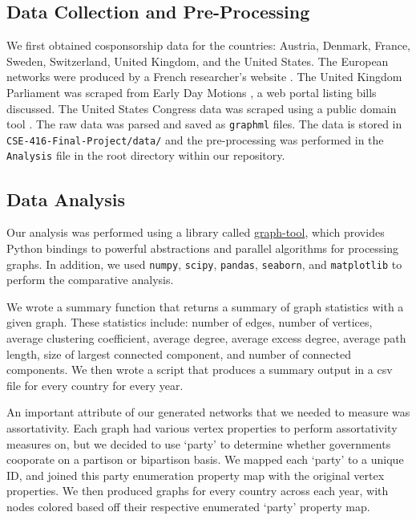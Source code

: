 \documentclass[12pt]{article}
\begin{document}
\begin{multicols*}{2}
\subsection{Data Collection and Pre-Processing}
We first obtained cosponsorship data for the countries: Austria, Denmark, France, Sweden, Switzerland, United Kingdom, and the United States. The European networks were produced by a French researcher's website \cite{briatte}. The United Kingdom Parliament was scraped from Early Day Motions \cite{UK}, a web portal listing bills discussed. The United States Congress data was scraped using a public domain tool \cite{US}. The raw data was parsed and saved as \texttt{graphml} files. 
The data is stored in \texttt{CSE-416-Final-Project/data/} and the pre-processing was performed in the \texttt{Analysis} file in the root directory within our repository.

\subsection{Data Analysis}

Our analysis was performed using a library called \href{https://graph-tool.skewed.de}{graph-tool}, which provides Python bindings to powerful abstractions and parallel algorithms for processing graphs. In addition, we used \texttt{numpy}, \texttt{scipy}, \texttt{pandas}, \texttt{seaborn}, and \texttt{matplotlib} to perform the comparative analysis.

We wrote a summary function that returns a summary of graph statistics with a given graph. These statistics include: number of edges, number of vertices, average clustering coefficient, average degree, average excess degree, average path length, size of largest connected component, and number of connected components. We then wrote a script that produces a summary output in a csv file for every country for every year. 

An important attribute of our generated networks that we needed to measure was assortativity. Each graph had various vertex properties to perform assortativity measures on, but we decided to use `party' to determine whether governments cooporate on a partison or bipartison basis. We mapped each `party' to a unique ID, and joined this party enumeration property map with the original vertex properties. We then produced graphs for every country across each year, with nodes colored based off their respective enumerated `party' property map.


\end{multicols*}
\end{document}
